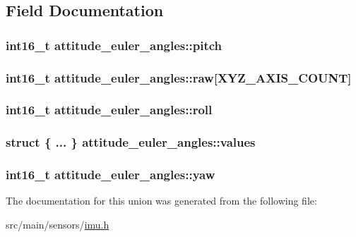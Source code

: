 \subsection{Field Documentation}
\hypertarget{unionattitude__euler__angles_a9da89c8841a0d57f895cab39aaeb65a2}{
\subsubsection[{pitch}]{\setlength{\rightskip}{0pt plus 5cm}int16\+\_\+t attitude\+\_\+euler\+\_\+angles\+::pitch}}\label{unionattitude__euler__angles_a9da89c8841a0d57f895cab39aaeb65a2}
\hypertarget{unionattitude__euler__angles_a45438ed4a3ca5bbee83e583ae13555ab}{
\subsubsection[{raw}]{\setlength{\rightskip}{0pt plus 5cm}int16\+\_\+t attitude\+\_\+euler\+\_\+angles\+::raw\mbox{[}{\bf X\+Y\+Z\+\_\+\+A\+X\+I\+S\+\_\+\+C\+O\+U\+N\+T}\mbox{]}}}\label{unionattitude__euler__angles_a45438ed4a3ca5bbee83e583ae13555ab}
\hypertarget{unionattitude__euler__angles_a4a05156a49183b640c9469163c9251bb}{
\subsubsection[{roll}]{\setlength{\rightskip}{0pt plus 5cm}int16\+\_\+t attitude\+\_\+euler\+\_\+angles\+::roll}}\label{unionattitude__euler__angles_a4a05156a49183b640c9469163c9251bb}
\hypertarget{unionattitude__euler__angles_a0c093821e87d54c958c28d0f9d0058ee}{
\subsubsection[{values}]{\setlength{\rightskip}{0pt plus 5cm}struct \{ ... \}   attitude\+\_\+euler\+\_\+angles\+::values}}\label{unionattitude__euler__angles_a0c093821e87d54c958c28d0f9d0058ee}
\hypertarget{unionattitude__euler__angles_a04c710c64c84841c0f7326c95e4df0b4}{
\subsubsection[{yaw}]{\setlength{\rightskip}{0pt plus 5cm}int16\+\_\+t attitude\+\_\+euler\+\_\+angles\+::yaw}}\label{unionattitude__euler__angles_a04c710c64c84841c0f7326c95e4df0b4}


The documentation for this union was generated from the following file\+:\begin{DoxyCompactItemize}
\item 
src/main/sensors/\hyperlink{sensors_2imu_8h}{imu.\+h}\end{DoxyCompactItemize}

